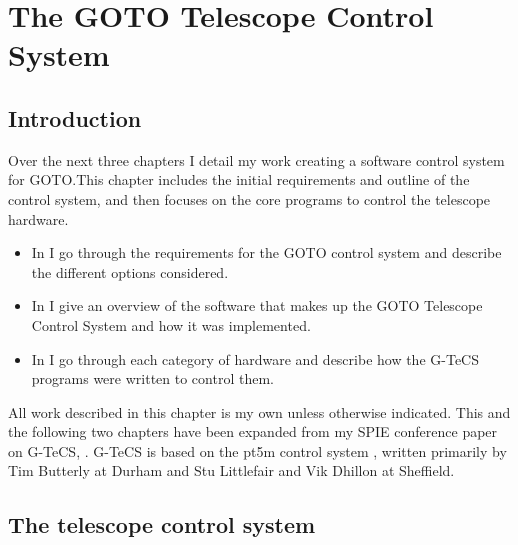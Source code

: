 
\chapter{The GOTO Telescope Control System}
\label{chap:gtecs}


\chaptoc{}


\section{Introduction}
\label{sec:gtecs_intro}


\begin{colsection}

Over the next three chapters I detail my work creating a software control system for GOTO.\@ This chapter includes the initial requirements and outline of the control system, and then focuses on the core programs to control the telescope hardware.
%
\begin{itemize}
    \item In  I go through the requirements for the GOTO control system and describe the different options considered.
    \item In  I give an overview of the software that makes up the GOTO Telescope Control System and how it was implemented.
    \item In  I go through each category of hardware and describe how the G-TeCS programs were written to control them.
\end{itemize}
%
All work described in this chapter is my own unless otherwise indicated. This and the following two chapters have been expanded from my SPIE conference paper on G-TeCS, \citet{Dyer}. G-TeCS is based on the pt5m control system \citep{pt5m}, written primarily by Tim Butterly at Durham and Stu Littlefair and Vik Dhillon at Sheffield.

\newpage

\end{colsection}


\section{The telescope control system}
\label{sec:control_systems}


